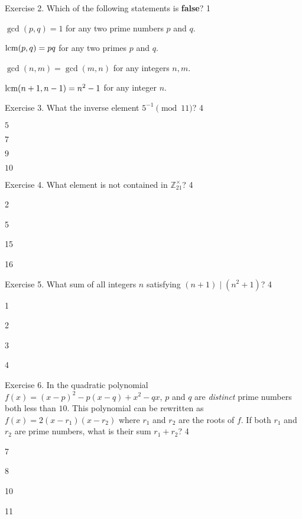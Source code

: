 \documentclass[../lecture-notes-148x210.tex]{subfiles}
\begin{document}
\begin{xexercise}
    {Exercise 2.}
    {Which of the following statements is \textbf{false}?}
    {1}
    {
        \item $\gcd(p,q)=1$ for any two prime numbers $p$ and $q$.
        \item $\text{lcm}(p,q)=pq$ for any two primes $p$ and $q$.
        \item $\gcd(n,m) = \gcd(m,n)$ for any integers $n,m$.
        \item $\text{lcm}(n+1,n-1) = n^2-1$ for any integer $n$.
    }
\end{xexercise}

\begin{xexercise}
    {Exercise 3.}
    {What the inverse element $5^{-1} \pmod{11}$?}
    {4}
    {
        \item $5$
        \item $7$
        \item $9$
        \item $10$
    }
\end{xexercise}

\begin{xexercise}
    {Exercise 4.}
    {What element is not contained in $\mathbb{Z}_{21}^{\times}$?}
    {4}
    {
        \item 2 
        \item 5
        \item 15
        \item 16
    }
\end{xexercise}

\newpage

\begin{xexercise}
    {Exercise 5.}
    {What sum of all integers $n$ satisfying $(n + 1) \mid (n^2 + 1)$?}
    {4}
    {
        \item 1
        \item 2
        \item 3
        \item 4
    }
\end{xexercise}

\begin{xexercise}
    {Exercise 6.} { In the quadratic polynomial $f(x) = (x-p)^2-p(x-q)+x^2-qx$,
    $p$ and $q$ are \emph{distinct} prime numbers both less than $10$. This
    polynomial can be rewritten as $f(x) = 2(x-r_1)(x-r_2)$ where $r_1$ and
    $r_2$ are the roots of $f$. If both $r_1$ and $r_2$ are prime numbers, what
    is their sum $r_1+r_2$? } {4} {
        \item 7
        \item 8
        \item 10
        \item 11
    }
\end{xexercise}
\end{document}
